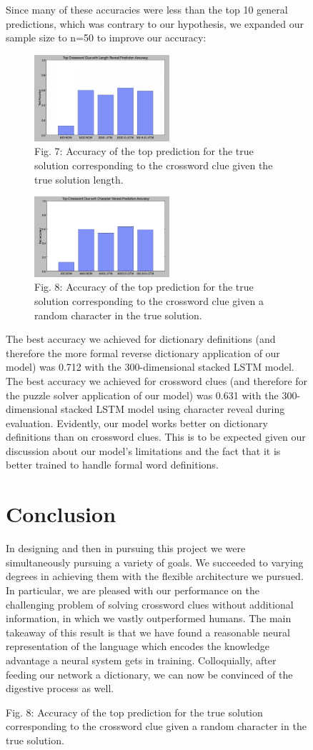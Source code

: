 \documentclass{article} %
\begin{document}
\begin{figure}
Since many of these accuracies were less than the top 10 general predictions, which was contrary to our hypothesis, we expanded our sample size to n=50 to improve our accuracy:

\begin{figure}
    \centering
	\includegraphics[width=50mm]{top50len.png}
	\caption{Fig. 7: Accuracy of the top prediction for the true solution corresponding to the crossword clue given the true solution length.}
\end{figure}

\begin{figure}
    \centering
	\includegraphics[width=50mm]{top50char.png}
	\caption{Fig. 8: Accuracy of the top prediction for the true solution corresponding to the crossword clue given a random character in the true solution.}
\end{figure}


The best accuracy we achieved for dictionary definitions (and therefore the more formal reverse dictionary application of our model) was 0.712 with the 300-dimensional stacked LSTM model. The best accuracy we achieved for crossword clues (and therefore for the puzzle solver application of our model) was 0.631 with the 300-dimensional stacked LSTM model using character reveal during evaluation. 
Evidently, our model works better on dictionary definitions than on crossword clues. This is to be expected given our discussion about our model’s limitations and the fact that it is better trained to handle formal word definitions. 


\section{Conclusion}
In designing and then in pursuing this project we were simultaneously pursuing a variety of goals. We succeeded to varying degrees in achieving them with the flexible architecture we pursued. In particular, we are pleased with our performance on the challenging problem of solving crossword clues without additional information, in which we vastly outperformed humans. The main takeaway of this result is that we have found a reasonable neural representation of the language which encodes the knowledge advantage a neural system gets in training. Colloquially, after feeding our network a dictionary, we can now be convinced of the digestive process as well.


\end{figure}
\end{document}
